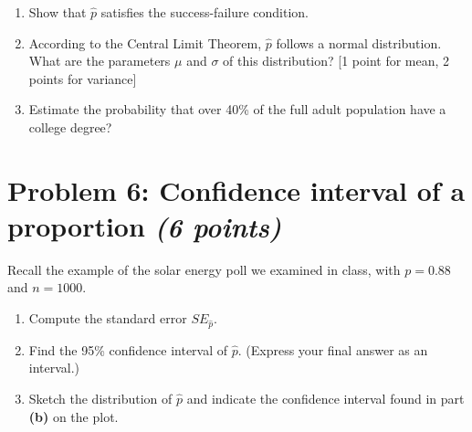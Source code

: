 \documentclass[11pt,twoside]{article}
\newcommand{\pts}[1]{\marginpar{ \small\hspace{0pt} \textit{[#1]} } }
\numberwithin{equation}{section}
\newcommand{\?}{\stackrel{?}{=}}
\begin{document}
  \begin{enumerate}[\bf (a)]
  \item Show that $\hat p$ satisfies the success-failure condition. \pts{2}
       \vspace{20ex}

       
\item  According \pts{3} to the Central Limit Theorem, $\hat p$ follows a normal distribution. What are the parameters $\mu$ and
  $\sigma$ of this distribution? [1 point for mean, 2 points for variance]

   \vspace{40ex}



\item Estimate the \pts{3} probability that over 40\% of the full adult population have a college degree?

 
\end{enumerate}

\eject


\section*{Problem 6: Confidence interval of a proportion \textit{(6 points)}}
Recall the example of the solar energy poll we examined in class, with $p=0.88$ and $n=1000$.

  \begin{enumerate}[\bf (a)]
  \item Compute the standard error $SE_{\hat p}$. \pts{2}
       \vspace{20ex}

       
\item Find the 95\% confidence interval of $\hat p$. (Express your final answer as an interval.) \pts{2}

   \vspace{40ex}


  
\item Sketch the distribution of $\hat p$ and indicate the confidence interval found in part \textbf{(b)} on the plot. \pts{2}

   \vspace{60ex}
 
\end{enumerate}

 
\end{document}
